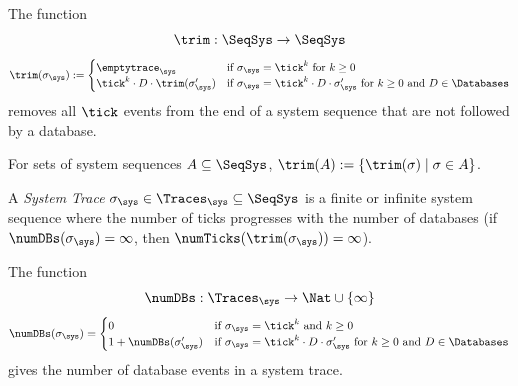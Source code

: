 \begin{definition}
    \label{def:trim-system-traces}
    The function
    \begin{equation*}
        \trim: \SeqSys \to \SeqSys
    \end{equation*}
    \begin{align*}
        \trim(\sigma_\sys) :=
        \begin{cases}
            \emptytrace_\sys
                &\text{if } \sigma_\sys = \tick^k
                \text{ for } k \geq 0 \\
            \tick^k \cdot D \cdot \trim(\sigma_\sys')
                &\text{if } \sigma_\sys = \tick^k \cdot D \cdot \sigma_\sys'
                \text{ for } k \geq 0
                \text{ and } D \in \Databases
        \end{cases}
    \end{align*}
    removes all $\tick$ events from the end of a system sequence
    that are not followed by a database.
\end{definition}

For sets of system sequences $A \subseteq \SeqSys$, 
$\trim(A) := \{ \trim(\sigma) \mid \sigma \in A \}$.

\begin{definition}
    \label{def:system-trace}
    A \emph{System Trace}
    $\sigma_\sys \in \Traces_\sys \subseteq \SeqSys$ 
    is a finite or infinite system sequence where
    the number of ticks progresses with the number of databases
    (if $\numDBs(\sigma_\sys) = \infty$, then
    $\numTicks(\trim(\sigma_\sys)) = \infty $).
\end{definition}

\begin{definition}
    \label{def:num-db}
    The function
    \begin{equation*}
        \numDBs : \Traces_\sys \to \Nat \cup \{ \infty \}
    \end{equation*}
    \begin{align*}
        \numDBs(\sigma_\sys) =
        \begin{cases}
            0 &\text{if } \sigma_\sys = \tick^k \text{ and } k \geq 0 \\
            1 + \numDBs(\sigma'_\sys)
                &\text{if } \sigma_\sys = \tick^k \cdot D \cdot \sigma'_\sys
                \text{ for } k \geq 0
                \text{ and } D \in \Databases
        \end{cases}
    \end{align*}
    gives the number of database events in a system trace.
\end{definition}



